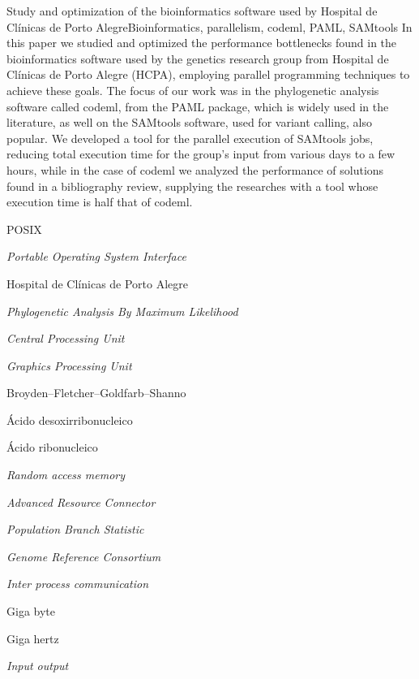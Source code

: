 \documentclass[cic,tc]{iiufrgs}
\begin{document}
\begin{englishabstract}{Study and optimization of the bioinformatics software used by Hospital de Clínicas de Porto Alegre}{Bioinformatics, parallelism, codeml, PAML, SAMtools} In this paper we studied and optimized the performance bottlenecks found in the bioinformatics software used by the genetics research group from Hospital de Clínicas de Porto Alegre (HCPA), employing parallel programming techniques to achieve these goals. The focus of our work was in the phylogenetic analysis software called codeml, from the PAML package, which is widely used in the literature, as well on the SAMtools software, used for variant calling, also popular. We developed a tool for the parallel execution of SAMtools jobs, reducing total execution time for the group's input from various days to a few hours, while in the case of codeml we analyzed the performance of solutions found in a bibliography review, supplying the researches with a tool whose execution time is half that of codeml.
\end{englishabstract}

\listoffigures

\listoftables

\begin{listofabbrv}{POSIX}
    \item[POSIX] \textit{Portable Operating System Interface}
    \item[HCPA] Hospital de Clínicas de Porto Alegre
    \item[PAML] \textit{Phylogenetic Analysis By Maximum Likelihood}
    \item[CPU] \textit{Central Processing Unit}
    \item[GPU] \textit{Graphics Processing Unit}
    \item[BFGS] Broyden–Fletcher–Goldfarb–Shanno
    \item[DNA] Ácido desoxirribonucleico
    \item[RNA] Ácido ribonucleico
    \item[RAM] \textit{Random access memory}
    \item[ARC] \textit{Advanced Resource Connector}
    \item[PBS] \textit{Population Branch Statistic}
    \item[GRC] \textit{Genome Reference Consortium}
    \item[IPC] \textit{Inter process communication}
    \item[GB] Giga byte
    \item[GHz] Giga hertz
    \item[IO] \textit{Input output}
\end{listofabbrv}
\end{document}
